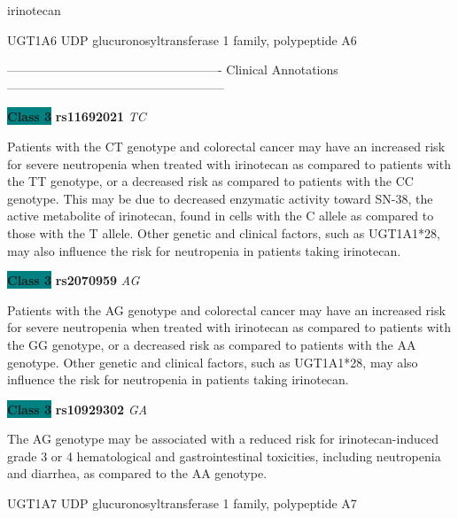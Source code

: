 \documentclass{resume} %
\begin{document}
\begin{rSection}{ irinotecan }
\begin{rSubsection}{ UGT1A6 }{ UDP glucuronosyltransferase 1 family, polypeptide A6 }{}{}
\item[] ---------------------------------------------------- Clinical Annotations -----------------------------------------------------\newline
\item \textbf{\colorbox{teal} {Class 3}} \textbf{ rs11692021 } \textit{ TC }
\item[] Patients with the CT genotype and colorectal cancer may have an increased risk for severe neutropenia when treated with irinotecan as compared to patients with the TT genotype, or a decreased risk as compared to patients with the CC genotype. This may be due to decreased enzymatic activity toward SN-38, the active metabolite of irinotecan, found in cells with the C allele as compared to those with the T allele. Other genetic and clinical factors, such as UGT1A1*28, may also influence the risk for neutropenia in patients taking irinotecan.\item \textbf{\colorbox{teal} {Class 3}} \textbf{ rs2070959 } \textit{ AG }
\item[] Patients with the AG genotype and colorectal cancer may have an increased risk for severe neutropenia when treated with irinotecan as compared to patients with the GG genotype, or a decreased risk as compared to patients with the AA genotype. Other genetic and clinical factors, such as UGT1A1*28, may also influence the risk for neutropenia in patients taking irinotecan.\item \textbf{\colorbox{teal} {Class 3}} \textbf{ rs10929302 } \textit{ GA }
\item[] The AG genotype may be associated with a reduced risk for irinotecan-induced grade 3 or 4 hematological and gastrointestinal toxicities, including neutropenia and diarrhea, as compared to the AA genotype. 
\end{rSubsection}\begin{rSubsection}{ UGT1A7 }{ UDP glucuronosyltransferase 1 family, polypeptide A7 }{}{}
\item[]


\end{rSubsection}
\end{rSection}
\end{document}
